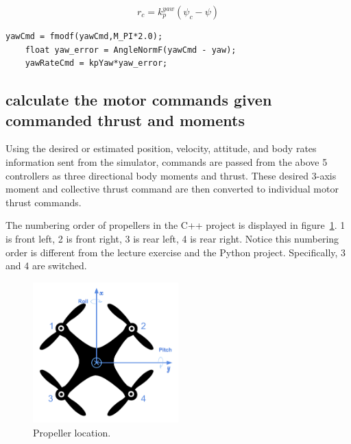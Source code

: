 \documentclass[letterpaper]{article}
\begin{document}
$$ r_c = k_p^{yaw} (\psi_c - \psi) $$

\begin{lstlisting}[frame=single]
    yawCmd = fmodf(yawCmd,M_PI*2.0);
    float yaw_error = AngleNormF(yawCmd - yaw);
    yawRateCmd = kpYaw*yaw_error;
\end{lstlisting}

\subsection{calculate the motor commands given commanded thrust and moments} \label{control:motorcommand}

Using the desired or estimated position, velocity, attitude, and body rates information sent from the simulator, commands are passed from the above 5 controllers as three directional body moments and thrust. These desired 3-axis moment and collective thrust command are then converted to individual motor thrust commands.

The numbering order of propellers in the C++ project is displayed in figure~\ref{fig:drone1}. 1 is front left, 2 is front right, 3 is rear left, 4 is rear right. Notice this numbering order is different from the lecture exercise and the Python project. Specifically, 3 and 4 are switched. 

\begin{figure}[ht]
\centering
\includegraphics[width=0.5\textwidth]{./fig/drone1.png}
\caption{\label{fig:drone1} Propeller location.}
\end{figure}
\end{document}
